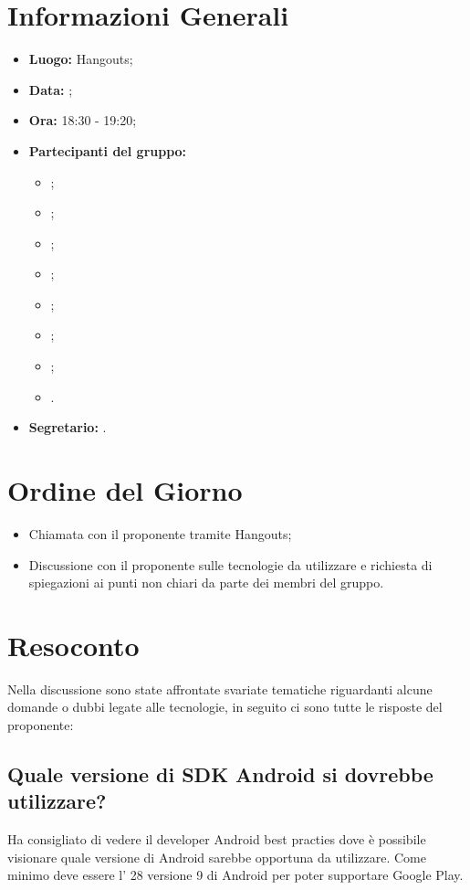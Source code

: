 \section{Informazioni Generali}
\begin{itemize}
\item \textbf{Luogo:} Hangouts;
\item \textbf{Data:} \Data;
\item \textbf{Ora:} 18:30 - 19:20;
\item \textbf{Partecipanti del gruppo:}
	\begin{itemize}
	\item \AT{}; 
	\item \CE{}; 
	\item \DF{};
	\item \LD{};
	\item \PF{};
	\item \SE{};
	\item \BR{};
	\item \LD{}.
	\end{itemize} 
\item \textbf{Segretario:} \MC{}.
\end{itemize}


\section{Ordine del Giorno}
\begin{itemize}
	\item Chiamata con il proponente tramite Hangouts;
	\item Discussione con il proponente sulle tecnologie da utilizzare e richiesta di spiegazioni ai punti non chiari da parte dei membri del gruppo.
\end{itemize}

\section{Resoconto}
Nella discussione sono state affrontate svariate tematiche riguardanti alcune domande o dubbi legate alle tecnologie, in seguito ci sono tutte le risposte del proponente:

\subsection{Quale versione di SDK Android si dovrebbe utilizzare?}
Ha consigliato di vedere il developer Android best practies dove è possibile visionare quale versione  di Android sarebbe opportuna da utilizzare. 
Come minimo deve essere l' 28 versione 9 di Android per poter supportare Google Play.

